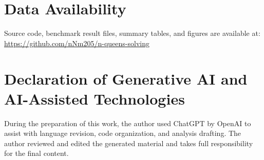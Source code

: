 \documentclass[a4paper,fleqn]{cas-sc}
\begin{document}
\section*{Data Availability}
Source code, benchmark result files, summary tables, and figures are available at:
\url{https://github.com/nNm205/n-queens-solving}

\section*{Declaration of Generative AI and AI-Assisted Technologies}
During the preparation of this work, the author used ChatGPT by OpenAI to assist with language revision, code organization, and analysis drafting. The author reviewed and edited the generated material and takes full responsibility for the final content.



\end{document}
